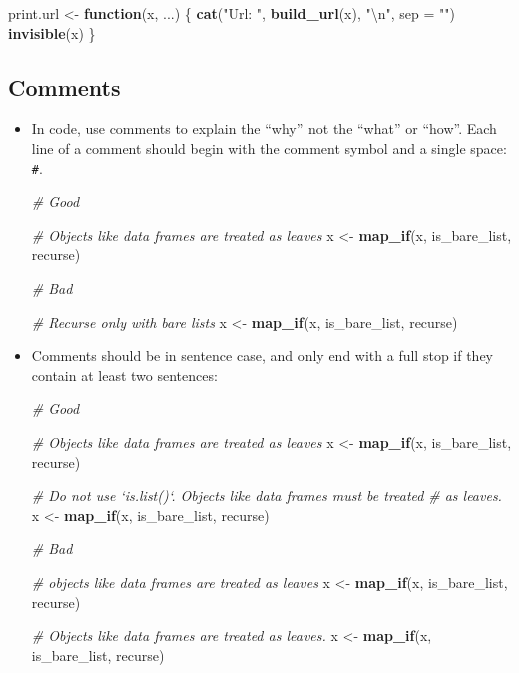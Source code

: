 \documentclass[
]{book}
\newenvironment{Shaded}{\begin{snugshade}}{\end{snugshade}}
\newcommand{\CharTok}[1]{\textcolor[rgb]{0.31,0.60,0.02}{#1}}
\newcommand{\CommentTok}[1]{\textcolor[rgb]{0.56,0.35,0.01}{\textit{#1}}}
\newcommand{\ControlFlowTok}[1]{\textcolor[rgb]{0.13,0.29,0.53}{\textbf{#1}}}
\newcommand{\DataTypeTok}[1]{\textcolor[rgb]{0.13,0.29,0.53}{#1}}
\newcommand{\KeywordTok}[1]{\textcolor[rgb]{0.13,0.29,0.53}{\textbf{#1}}}
\newcommand{\NormalTok}[1]{#1}
\newcommand{\StringTok}[1]{\textcolor[rgb]{0.31,0.60,0.02}{#1}}
\begin{document}
\begin{itemize}
\begin{Shaded}
\begin{Highlighting}[]
\NormalTok{print.url <-}\StringTok{ }\ControlFlowTok{function}\NormalTok{(x, ...) \{}
    \KeywordTok{cat}\NormalTok{(}\StringTok{"Url: "}\NormalTok{, }\KeywordTok{build_url}\NormalTok{(x), }\StringTok{"}\CharTok{\textbackslash{}n}\StringTok{"}\NormalTok{, }\DataTypeTok{sep =} \StringTok{""}\NormalTok{)}
    \KeywordTok{invisible}\NormalTok{(x)}
\NormalTok{\}}
\end{Highlighting}
\end{Shaded}
\end{itemize}

\hypertarget{comments-1}{%
\subsection{Comments}\label{comments-1}}

\begin{itemize}
\item
  In code, use comments to explain the ``why'' not the ``what'' or ``how''. Each
  line of a comment should begin with the comment symbol and a single space:
  \texttt{\#}.

\begin{Shaded}
\begin{Highlighting}[]
\CommentTok{# Good}

\CommentTok{# Objects like data frames are treated as leaves}
\NormalTok{x <-}\StringTok{ }\KeywordTok{map_if}\NormalTok{(x, is_bare_list, recurse)}


\CommentTok{# Bad}

\CommentTok{# Recurse only with bare lists}
\NormalTok{x <-}\StringTok{ }\KeywordTok{map_if}\NormalTok{(x, is_bare_list, recurse)}
\end{Highlighting}
\end{Shaded}
\item
  Comments should be in sentence case, and only end with a full stop if they
  contain at least two sentences:

\begin{Shaded}
\begin{Highlighting}[]
\CommentTok{# Good}

\CommentTok{# Objects like data frames are treated as leaves}
\NormalTok{x <-}\StringTok{ }\KeywordTok{map_if}\NormalTok{(x, is_bare_list, recurse)}

\CommentTok{# Do not use `is.list()`. Objects like data frames must be treated}
\CommentTok{# as leaves.}
\NormalTok{x <-}\StringTok{ }\KeywordTok{map_if}\NormalTok{(x, is_bare_list, recurse)}


\CommentTok{# Bad}

\CommentTok{# objects like data frames are treated as leaves}
\NormalTok{x <-}\StringTok{ }\KeywordTok{map_if}\NormalTok{(x, is_bare_list, recurse)}

\CommentTok{# Objects like data frames are treated as leaves.}
\NormalTok{x <-}\StringTok{ }\KeywordTok{map_if}\NormalTok{(x, is_bare_list, recurse)}
\end{Highlighting}
\end{Shaded}
\end{itemize}
\end{document}
